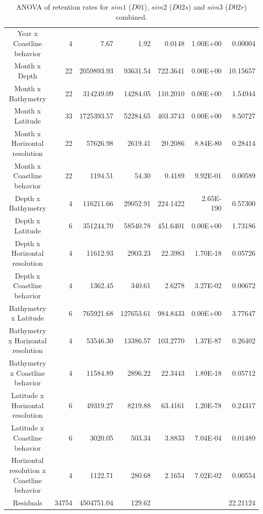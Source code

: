 \begin{table}[H]
\begin{adjustbox}{width=0.9\textwidth}
\begin{tabular}{c|r|r|r|r|r|r}
Year x Coastline behavior        & 4  & 7.67       & 1.92       & 0.0148     & 1.00E+00  & 0.00004  \\
Month x Depth                    & 22 & 2059893.93 & 93631.54   & 722.3641   & 0.00E+00  & 10.15657 \\
Month x Bathymetry               & 22 & 314249.09  & 14284.05   & 110.2010   & 0.00E+00  & 1.54944  \\
Month x Latitude                 & 33 & 1725393.57 & 52284.65   & 403.3743   & 0.00E+00  & 8.50727  \\
Month x Horizontal resolution    & 22 & 57626.98   & 2619.41    & 20.2086    & 8.84E-80  & 0.28414  \\
Month x Coastline behavior       & 22 & 1194.51    & 54.30      & 0.4189     & 9.92E-01  & 0.00589  \\
Depth x Bathymetry               & 4  & 116211.66  & 29052.91   & 224.1422   & 2.65E-190 & 0.57300  \\
Depth x Latitude                 & 6  & 351244.70  & 58540.78   & 451.6401   & 0.00E+00  & 1.73186  \\
Depth x Horizontal resolution    & 4  & 11612.93   & 2903.23    & 22.3983    & 1.70E-18  & 0.05726  \\
Depth x Coastline behavior       & 4  & 1362.45    & 340.61     & 2.6278     & 3.27E-02  & 0.00672  \\
Bathymetry x Latitude            & 6  & 765921.68  & 127653.61  & 984.8433   & 0.00E+00  & 3.77647  \\
Bathymetry x Horizontal resolution & 4 & 53546.30 & 13386.57 & 103.2770 & 1.37E-87 & 0.26402 \\
Bathymetry x Coastline behavior    & 4 & 11584.89   & 2896.22    & 22.3443    & 1.89E-18  & 0.05712  \\
Latitude x Horizontal resolution   & 6 & 49319.27   & 8219.88    & 63.4161    & 1.20E-78  & 0.24317  \\
Latitude x Coastline behavior      & 6 & 3020.05    & 503.34     & 3.8833     & 7.04E-04  & 0.01489  \\
Horizontal resolution x Coastline   behavior & 4 & 1122.71  & 280.68   & 2.1654   & 7.02E-02 & 0.00554 \\
Residuals                        	& 34754 & 4504751.04 & 129.62     &        &           & 22.21124\\
\hline
\end{tabular}
\end{adjustbox}
\caption{ANOVA of retention rates for $sim 1$ ($D01$), $sim 2$ ($D02s$) and $sim 3$ ($D02r$) combined.}
\label{TabAnovaSimus}
\end{table}

